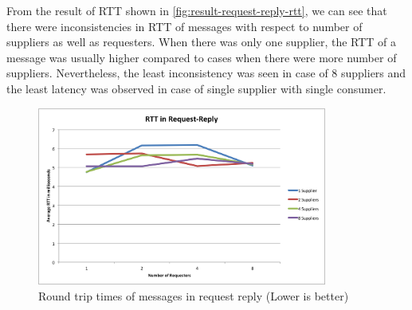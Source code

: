   From the result of RTT shown in \autoref{fig:result-request-reply-rtt}, we can see that there were inconsistencies in RTT of messages with respect to number of suppliers as well as requesters. When there was only one supplier, the RTT of a message was usually higher compared to cases when there were more number of suppliers. Nevertheless, the least inconsistency was seen in case of 8 suppliers and the least latency was observed in case of single supplier with single consumer.

  \begin{figure}[H]
    \centering    \includegraphics[width=0.85\textwidth]{figures/10request-reply-rtt}
    \caption[Round trip times of messages in request reply]{Round trip times of messages in request reply (Lower is better)}
    \label{fig:result-request-reply-rtt}
  \end{figure}
